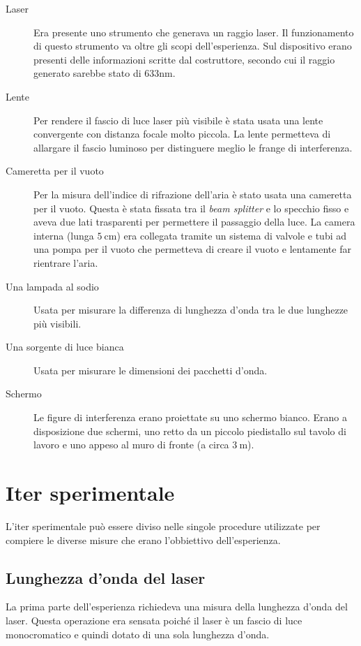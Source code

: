 \documentclass[a4paper,11pt]{article}
\begin{document}
\begin{description}
	
	\item[Laser] Era presente uno strumento che generava un raggio laser. Il funzionamento di questo strumento va oltre gli scopi dell'esperienza. Sul dispositivo erano presenti delle informazioni scritte dal costruttore, secondo cui il raggio generato sarebbe stato di $ 633\si{\nano\meter} $.
	\item[Lente] Per rendere il fascio di luce laser più visibile è stata usata una lente convergente con distanza focale molto piccola. La lente permetteva di allargare il fascio luminoso per distinguere meglio le frange di interferenza.
	\item[Cameretta per il vuoto] Per la misura dell'indice di rifrazione dell'aria è stato usata una cameretta per il vuoto. Questa è stata fissata tra il \emph{beam splitter} e lo specchio fisso e aveva due lati trasparenti per permettere il passaggio della luce. La camera interna (lunga $ \SI{5}{\centi\meter}$) era collegata tramite un sistema di valvole e tubi ad una pompa per il vuoto che permetteva di creare il vuoto e lentamente far rientrare l'aria.
	\item[Una lampada al sodio] Usata per misurare la differenza di lunghezza d'onda tra le due lunghezze più visibili.
	\item[Una sorgente di luce bianca] Usata per misurare le dimensioni dei pacchetti d'onda.
	\item[Schermo] Le figure di interferenza erano proiettate su uno schermo bianco. Erano a disposizione due schermi, uno retto da un piccolo piedistallo sul tavolo di lavoro e uno appeso al muro di fronte (a circa $ \SI{3}{\meter} $).
\end{description}

\section{Iter sperimentale}\label{proc}
L'iter sperimentale può essere diviso nelle singole procedure utilizzate per compiere le diverse misure che erano l'obbiettivo dell'esperienza.

\subsection{Lunghezza d'onda del laser}
La prima parte dell'esperienza richiedeva una misura della lunghezza d'onda del laser. Questa operazione era sensata poiché il laser è un fascio di luce monocromatico e quindi dotato di una sola lunghezza d'onda.
\end{document}
